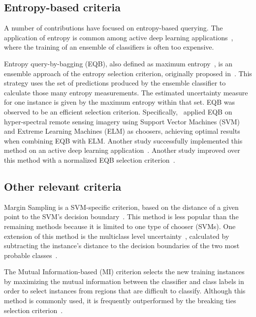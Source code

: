 \documentclass[preprint,12pt]{elsarticle}
\begin{document}
\subsection{Entropy-based criteria}

A number of contributions have focused on entropy-based querying. The
application of entropy is common among active deep learning
applications~\cite{Aghdam2019}, where the training of an ensemble of
classifiers is often too expensive. 

Entropy query-by-bagging (EQB), also defined as maximum
entropy~\cite{Liu2020}, is an ensemble approach of the entropy selection
criterion, originally proposed in~\cite{Tuia2009}. This strategy uses the set
of predictions produced by the ensemble classifier to calculate those many
entropy measurements. The estimated uncertainty measure for one instance is
given by the maximum entropy within that set. EQB was observed to be an
efficient selection criterion. Specifically,~\cite{Shrivastava2021} applied
EQB on hyper-spectral remote sensing imagery using Support Vector Machines
(SVM) and Extreme Learning Machines (ELM) as choosers, achieving optimal
results when combining EQB with ELM\@. Another study successfully implemented
this method on an active deep learning application~\cite{Liu2020}. Another
study improved over this method with a normalized EQB selection
criterion~\cite{Copa2010}.

\subsection{Other relevant criteria}

Margin Sampling is a SVM-specific criterion, based on the distance of a given
point to the SVM's decision boundary~\cite{Shrivastava2021}. This method is
less popular than the remaining methods because it is limited to one type of
chooser (SVMs). One extension of this method is the multiclass level
uncertainty~\cite{Shrivastava2021}, calculated by subtracting the instance's
distance to the decision boundaries of the two most probable
classes~\cite{Demir2011}.

The Mutual Information-based (MI) criterion selects the new training instances
by maximizing the mutual information between the classifier and class labels
in order to select instances from regions that are difficult to classify.
Although this method is commonly used, it is frequently outperformed by the
breaking ties selection criterion~\cite{Li2011,Liu2018}.
\end{document}

